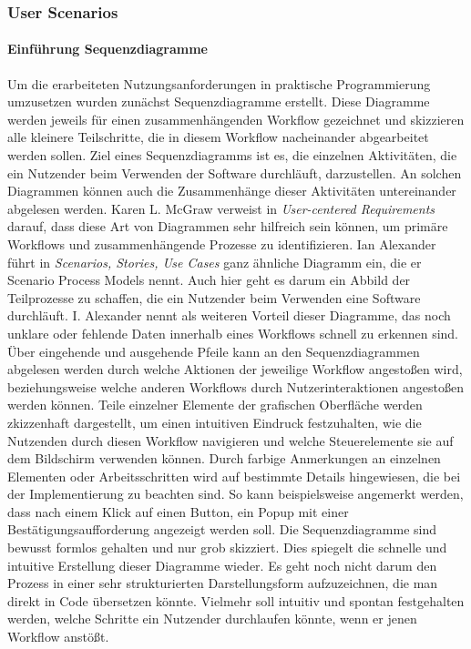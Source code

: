 \documentclass[12pt]{article}
\begin{document}
\subsubsection{User Scenarios}

\paragraph{Einführung Sequenzdiagramme}
Um die erarbeiteten Nutzungsanforderungen in praktische Programmierung
umzusetzen wurden zunächst Sequenzdiagramme erstellt. Diese Diagramme werden
jeweils für einen zusammenhängenden Workflow gezeichnet und skizzieren alle
kleinere Teilschritte, die in diesem Workflow nacheinander abgearbeitet werden
sollen. Ziel eines Sequenzdiagramms ist es, die einzelnen Aktivitäten, die ein
Nutzender beim Verwenden der Software durchläuft,
darzustellen.\cite{holtzblattCDEvolved} An solchen Diagrammen können auch die
Zusammenhänge dieser Aktivitäten untereinander abgelesen werden. Karen L.
McGraw verweist in \textit{User-centered Requirements} darauf, dass diese Art
von Diagrammen sehr hilfreich sein können, um primäre Workflows und
zusammenhängende Prozesse zu identifizieren\cite{sequenceDiagrams}. Ian
Alexander führt in \textit{Scenarios, Stories, Use Cases} ganz ähnliche
Diagramm ein, die er Scenario Process Models nennt. Auch hier geht es darum ein
Abbild der Teilprozesse zu schaffen, die ein Nutzender beim Verwenden eine
Software durchläuft. I. Alexander nennt als weiteren Vorteil dieser Diagramme,
das noch unklare oder fehlende Daten innerhalb eines Workflows schnell zu
erkennen sind. Über eingehende und ausgehende Pfeile kann an den
Sequenzdiagrammen abgelesen werden durch welche Aktionen der jeweilige Workflow
angestoßen wird, beziehungsweise welche anderen Workflows durch
Nutzerinteraktionen angestoßen werden können. Teile einzelner Elemente der
grafischen Oberfläche werden zkizzenhaft dargestellt, um einen intuitiven
Eindruck festzuhalten, wie die Nutzenden durch diesen Workflow navigieren und
welche Steuerelemente sie auf dem Bildschirm verwenden können. Durch farbige
Anmerkungen an einzelnen Elementen oder Arbeitsschritten wird auf bestimmte
Details hingewiesen, die bei der Implementierung zu beachten sind. So kann
beispielsweise angemerkt werden, dass nach einem Klick auf einen Button, ein
Popup mit einer Bestätigungsaufforderung angezeigt werden soll. Die
Sequenzdiagramme sind bewusst formlos gehalten und nur grob skizziert. Dies
spiegelt die schnelle und intuitive Erstellung dieser Diagramme wieder. Es geht
noch nicht darum den Prozess in einer sehr strukturierten Darstellungsform
aufzuzeichnen, die man direkt in Code übersetzen könnte. Vielmehr soll intuitiv
und spontan festgehalten werden, welche Schritte ein Nutzender durchlaufen
könnte, wenn er jenen Workflow anstößt.
\end{document}
